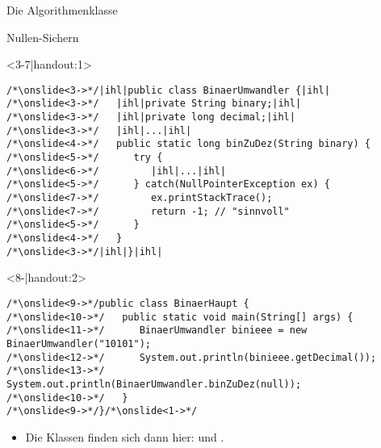 {
\begin{frame}[c]{Die Algorithmenklasse}
%
\end{frame}
\SidebarReset


\SidebarSolution
\begin{frame}[fragile, c]{Nullen-Sichern}
\SetupLstHl
\begin{onlyenv}<3-7|handout:1>
\begin{verbatim}
/*\onslide<3->*/|ihl|public class BinaerUmwandler {|ihl|
/*\onslide<3->*/   |ihl|private String binary;|ihl|
/*\onslide<3->*/   |ihl|private long decimal;|ihl|
/*\onslide<3->*/   |ihl|...|ihl|
/*\onslide<4->*/   public static long binZuDez(String binary) {
/*\onslide<5->*/      try {
/*\onslide<6->*/         |ihl|...|ihl|
/*\onslide<5->*/      } catch(NullPointerException ex) {
/*\onslide<7->*/         ex.printStackTrace();
/*\onslide<7->*/         return -1; // "sinnvoll"
/*\onslide<5->*/      }
/*\onslide<4->*/   }
/*\onslide<3->*/|ihl|}|ihl|
\end{verbatim}
\end{onlyenv}
\begin{onlyenv}<8-|handout:2>
\begin{verbatim}
/*\onslide<9->*/public class BinaerHaupt {
/*\onslide<10->*/   public static void main(String[] args) {
/*\onslide<11->*/      BinaerUmwandler binieee = new BinaerUmwandler("10101");
/*\onslide<12->*/      System.out.println(binieee.getDecimal());
/*\onslide<13->*/      System.out.println(BinaerUmwandler.binZuDez(null));
/*\onslide<10->*/   }
/*\onslide<9->*/}/*\onslide<1->*/
\end{verbatim}
\end{onlyenv}
\begin{itemize}
   \item<14-> Die Klassen finden sich dann hier:  und .
\end{itemize}
\end{frame}
\SidebarReset

}
